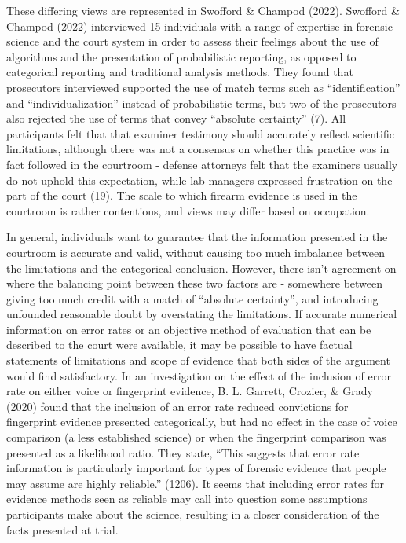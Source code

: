 \documentclass[print]{nuthesis}
\begin{document}
These differing views are represented in Swofford \& Champod (2022).
Swofford \& Champod (2022) interviewed 15 individuals with a range of expertise in forensic science and the court system in order to assess their feelings about the use of algorithms and the presentation of probabilistic reporting, as opposed to categorical reporting and traditional analysis methods.
They found that prosecutors interviewed supported the use of match terms such as ``identification'' and ``individualization'' instead of probabilistic terms, but two of the prosecutors also rejected the use of terms that convey ``absolute certainty'' (7).
All participants felt that that examiner testimony should accurately reflect scientific limitations, although there was not a consensus on whether this practice was in fact followed in the courtroom - defense attorneys felt that the examiners usually do not uphold this expectation, while lab managers expressed frustration on the part of the court (19).
The scale to which firearm evidence is used in the courtroom is rather contentious, and views may differ based on occupation.

In general, individuals want to guarantee that the information presented in the courtroom is accurate and valid, without causing too much imbalance between the limitations and the categorical conclusion.
However, there isn't agreement on where the balancing point between these two factors are - somewhere between giving too much credit with a match of ``absolute certainty'', and introducing unfounded reasonable doubt by overstating the limitations.
If accurate numerical information on error rates or an objective method of evaluation that can be described to the court were available, it may be possible to have factual statements of limitations and scope of evidence that both sides of the argument would find satisfactory.
In an investigation on the effect of the inclusion of error rate on either voice or fingerprint evidence, B. L. Garrett, Crozier, \& Grady (2020) found that the inclusion of an error rate reduced convictions for fingerprint evidence presented categorically, but had no effect in the case of voice comparison (a less established science) or when the fingerprint comparison was presented as a likelihood ratio.
They state, ``This suggests that error rate information is particularly important for types of forensic evidence that people may assume are highly reliable.'' (1206).
It seems that including error rates for evidence methods seen as reliable may call into question some assumptions participants make about the science, resulting in a closer consideration of the facts presented at trial.
\end{document}
